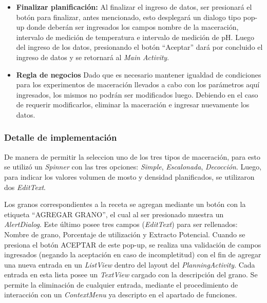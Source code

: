 \begin{itemize}
                    \item \textbf{Finalizar planificación:} Al finalizar el ingreso de datos, ser presionará el botón para finalizar, antes mencionado, esto desplegará un dialogo tipo pop-up donde deberán ser ingresados los campos nombre de la maceración, intervalo de medición de temperatura e intervalo de medición de pH. Luego del ingreso de los datos, presionando el botón ``Aceptar'' dará por concluido el ingreso de datos y se retornará al \textit{Main Activity}.
                    
                    \item \textbf{Regla de negocios} Dado que es necesario mantener igualdad de condiciones para los experimentos de maceración llevados a cabo con los parámetros aquí ingresados, los mismos no podrán ser modificados luego. Debiendo en el caso de requerir modificarlos, eliminar la maceración e ingresar nuevamente los datos.
                \end{itemize}
            
            \subsubsection{Detalle de implementación}
                \par De manera de permitir la seleccion uno de los tres tipos de maceración, para esto se utilizó un \textit{Spinner} con las tres opciones: \textit{Simple}, \textit{Escalonada}, \textit{Decocción}. Luego, para indicar los valores volumen de mosto y densidad planificados, se utilizaron dos \textit{EditText}. %
                
                \par Los granos correspondientes a la receta se agregan mediante un botón con la etiqueta ``AGREGAR GRANO'', el cual al ser presionado muestra un \textit{AlertDialog}. Este último posee tres campos (\textit{EditText}) para ser rellenados: Nombre de grano, Porcentaje de utilización y Extracto Potencial. Cuando se presiona el botón ACEPTAR de este pop-up, se realiza una validación de campos ingresados (negando la aceptación en caso de incompletitud) con el fin de agregar una nueva entrada en un \textit{ListView} dentro del layout del \textit{PlanningActivity}. Cada entrada en esta lista posee un \textit{TextView} cargado con la descripción del grano. Se permite la eliminación de cualquier entrada, mediante el procedimiento de interacción con un \textit{ContextMenu} ya descripto en el apartado de funciones.
                
